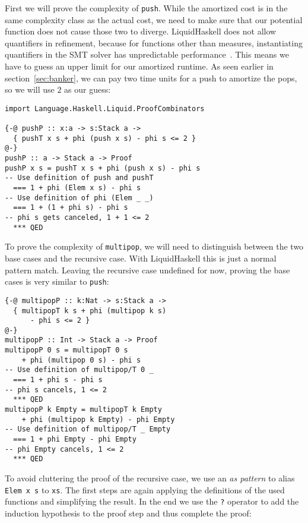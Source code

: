 \documentclass[sigplan,screen]{acmart}
\begin{document}
First we will prove the complexity of \texttt{push}. While the amortized cost is in the same complexity class as the actual cost, we need to make sure that our potential function does not cause those two to diverge. LiquidHaskell does not allow quantifiers in refinement, because for functions other than measures, instantiating quantifiers in the SMT solver has unpredictable performance~\cite{lh_quantifiers}. This means we have to guess an upper limit for our amortized runtime. As seen earlier in section~\ref{sec:banker}, we can pay two time units for a push to amortize the pops, so we will use $2$ as our guess:

\begin{lstlisting}
import Language.Haskell.Liquid.ProofCombinators

{-@ pushP :: x:a -> s:Stack a ->
  { pushT x s + phi (push x s) - phi s <= 2 }
@-}
pushP :: a -> Stack a -> Proof
pushP x s = pushT x s + phi (push x s) - phi s
-- Use definition of push and pushT
  === 1 + phi (Elem x s) - phi s
-- Use definition of phi (Elem _ _)
  === 1 + (1 + phi s) - phi s
-- phi s gets canceled, 1 + 1 <= 2
  *** QED
\end{lstlisting}

To prove the complexity of \texttt{multipop}, we will need to distinguish between the two base cases and the recursive case. With LiquidHaskell this is just a normal pattern match. Leaving the recursive case undefined for now, proving the base cases is very similar to \texttt{push}:

\begin{lstlisting}
{-@ multipopP :: k:Nat -> s:Stack a ->
  { multipopT k s + phi (multipop k s)
      - phi s <= 2 }
@-}
multipopP :: Int -> Stack a -> Proof
multipopP 0 s = multipopT 0 s
    + phi (multipop 0 s) - phi s
-- Use definition of multipop/T 0 _
  === 1 + phi s - phi s
-- phi s cancels, 1 <= 2
  *** QED
multipopP k Empty = multipopT k Empty
    + phi (multipop k Empty) - phi Empty
-- Use definition of multipop/T _ Empty
  === 1 + phi Empty - phi Empty
-- phi Empty cancels, 1 <= 2
  *** QED
\end{lstlisting}

To avoid cluttering the proof of the recursive case, we use an \textit{as pattern} to alias \texttt{Elem x s} to \texttt{xs}. The first steps are again applying the definitions of the used functions and simplifying the result. In the end we use the \texttt{?} operator to add the induction hypothesis to the proof step and thus complete the proof:
\end{document}
